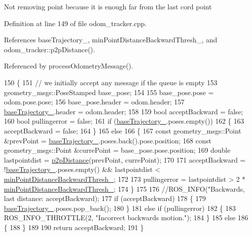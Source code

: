 Not removing point because it is enough far from the last cord point 

Definition at line 149 of file odom\+\_\+tracker.\+cpp.



References base\+Trajectory\+\_\+, min\+Point\+Distance\+Backward\+Thresh\+\_\+, and odom\+\_\+tracker\+::p2p\+Distance().



Referenced by process\+Odometry\+Message().


\begin{DoxyCode}
150 \{
151     \textcolor{comment}{// we initially accept any message if the queue is empty}
153 \textcolor{comment}{}    geometry\_msgs::PoseStamped base\_pose;
154 
155     base\_pose.pose = odom.pose.pose;
156     base\_pose.header = odom.header;
157     \hyperlink{classodom__tracker_1_1OdomTracker_a889adca220c33056d9a582eceda64adc}{baseTrajectory\_}.header = odom.header;
158 
159     \textcolor{keywordtype}{bool} acceptBackward = \textcolor{keyword}{false};
160     \textcolor{keywordtype}{bool} pullingerror = \textcolor{keyword}{false};
161     \textcolor{keywordflow}{if} (\hyperlink{classodom__tracker_1_1OdomTracker_a889adca220c33056d9a582eceda64adc}{baseTrajectory\_}.poses.empty())
162     \{
163         acceptBackward = \textcolor{keyword}{false};
164     \}
165     \textcolor{keywordflow}{else}
166     \{
167         \textcolor{keyword}{const} geometry\_msgs::Point &prevPoint = \hyperlink{classodom__tracker_1_1OdomTracker_a889adca220c33056d9a582eceda64adc}{baseTrajectory\_}.poses.back().pose.position;
168         \textcolor{keyword}{const} geometry\_msgs::Point &currePoint = base\_pose.pose.position;
169         \textcolor{keywordtype}{double} lastpointdist = \hyperlink{namespaceodom__tracker_a18caccd20c7915e29706a95860e34cca}{p2pDistance}(prevPoint, currePoint);
170 
171         acceptBackward = !\hyperlink{classodom__tracker_1_1OdomTracker_a889adca220c33056d9a582eceda64adc}{baseTrajectory\_}.poses.empty() && lastpointdist < 
      \hyperlink{classodom__tracker_1_1OdomTracker_ae168f975b648874e7f00c2431683b3b1}{minPointDistanceBackwardThresh\_};
172 
173         pullingerror = lastpointdist > 2 * \hyperlink{classodom__tracker_1_1OdomTracker_ae168f975b648874e7f00c2431683b3b1}{minPointDistanceBackwardThresh\_};
174     \}
175 
176     \textcolor{comment}{//ROS\_INFO("Backwards, last distance: %
       acceptBackward);}
177     \textcolor{keywordflow}{if} (acceptBackward)
178     \{
179         \hyperlink{classodom__tracker_1_1OdomTracker_a889adca220c33056d9a582eceda64adc}{baseTrajectory\_}.poses.pop\_back();
180     \}
181     \textcolor{keywordflow}{else} \textcolor{keywordflow}{if} (pullingerror)
182     \{
183         ROS\_INFO\_THROTTLE(2, \textcolor{stringliteral}{"Incorrect backwards motion."});
184     \}
185     \textcolor{keywordflow}{else}
186     \{
188     \}
189 
190     \textcolor{keywordflow}{return} acceptBackward;
191 \}
\end{DoxyCode}


